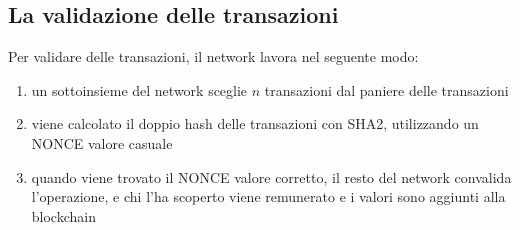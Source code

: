 \documentclass[11pt, oneside]{article}   	%
\begin{document}
\subsection*{La validazione delle transazioni}
Per validare delle transazioni, il network lavora nel seguente modo:
\begin{enumerate}
\item un sottoinsieme del network sceglie $n$ transazioni dal paniere delle transazioni
\item viene calcolato il doppio hash delle transazioni con SHA2, utilizzando un NONCE valore casuale
\item quando viene trovato il NONCE valore corretto, il resto del network convalida l'operazione, e chi l'ha scoperto viene remunerato e i valori sono aggiunti alla blockchain
\end{enumerate}
\end{document}
